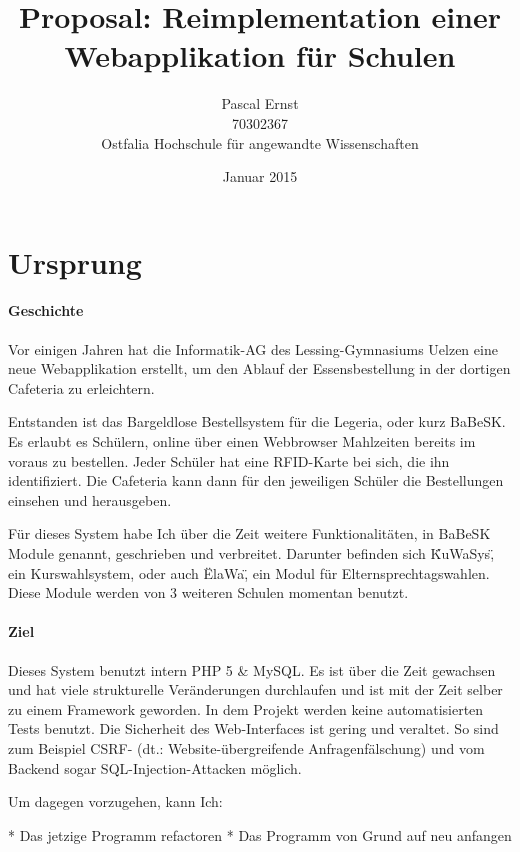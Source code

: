 \documentclass[a4paper,10pt]{scrartcl}
\begin{document}
\title{Proposal: Reimplementation einer Webapplikation für Schulen}
\author{Pascal Ernst\\
  70302367 \\
  Ostfalia Hochschule für angewandte Wissenschaften}
\date{Januar 2015}
\maketitle

\newpage

\section{Ursprung}

  \paragraph{Geschichte}
    Vor einigen Jahren hat die Informatik-AG des Lessing-Gymnasiums Uelzen eine
    neue Webapplikation erstellt, um den Ablauf der Essensbestellung in der
    dortigen Cafeteria zu erleichtern.

    Entstanden ist das Bargeldlose Bestellsystem für die Legeria, oder kurz
    BaBeSK.
    Es erlaubt es Schülern, online über einen Webbrowser Mahlzeiten bereits im
    voraus zu bestellen.
    Jeder Schüler hat eine RFID-Karte bei sich, die ihn identifiziert.
    Die Cafeteria kann dann für den jeweiligen Schüler die Bestellungen einsehen
    und herausgeben.

    Für dieses System habe Ich über die Zeit weitere Funktionalitäten, in BaBeSK
    Module genannt, geschrieben und verbreitet.
    Darunter befinden sich \"KuWaSys\", ein Kurswahlsystem, oder auch \"ElaWa\",
    ein Modul für Elternsprechtagswahlen.
    Diese Module werden von 3 weiteren Schulen momentan benutzt.

  \paragraph{Ziel}
    Dieses System benutzt intern PHP 5 \& MySQL.
    Es ist über die Zeit gewachsen und hat viele strukturelle Veränderungen
    durchlaufen und ist mit der Zeit selber zu einem Framework geworden.
    In dem Projekt werden keine automatisierten Tests benutzt.
    Die Sicherheit des Web-Interfaces ist gering und veraltet.
    So sind zum Beispiel CSRF- (dt.: Website-übergreifende
    Anfragenfälschung) und vom Backend sogar SQL-Injection-Attacken möglich.

    Um dagegen vorzugehen, kann Ich:

      * Das jetzige Programm refactoren
      * Das Programm von Grund auf neu anfangen

    
\end{document}
